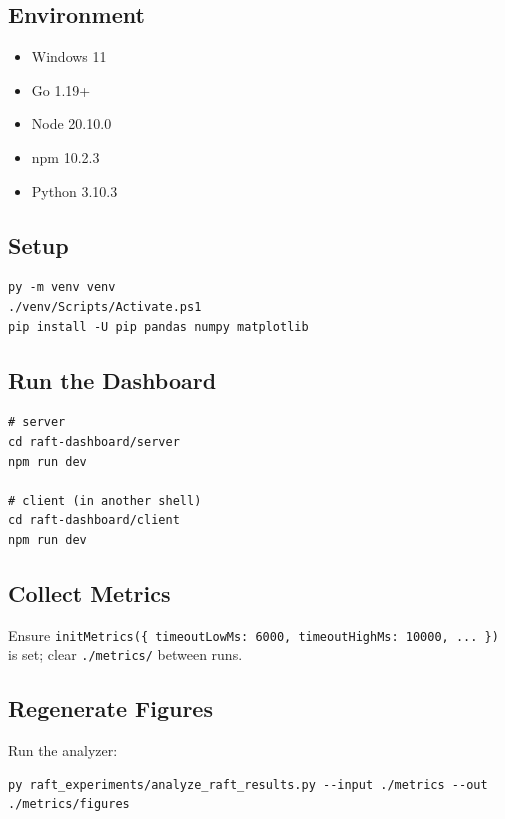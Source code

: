 \documentclass[11pt]{article}
\begin{document}
\subsection*{Environment}
\begin{itemize}
  \item Windows 11
  \item Go 1.19+
  \item Node 20.10.0
  \item npm 10.2.3
  \item Python 3.10.3
\end{itemize}

\subsection*{Setup}
\begin{verbatim}
py -m venv venv
./venv/Scripts/Activate.ps1
pip install -U pip pandas numpy matplotlib
\end{verbatim}

\subsection*{Run the Dashboard}
\begin{verbatim}
# server
cd raft-dashboard/server
npm run dev

# client (in another shell)
cd raft-dashboard/client
npm run dev
\end{verbatim}

\subsection*{Collect Metrics}
Ensure
\texttt{initMetrics(\{ timeoutLowMs: 6000, timeoutHighMs: 10000, ... \})}
is set; clear \texttt{./metrics/} between runs.

\subsection*{Regenerate Figures}
Run the analyzer:
\begin{verbatim}
py raft_experiments/analyze_raft_results.py --input ./metrics --out ./metrics/figures
\end{verbatim}



\end{document}
